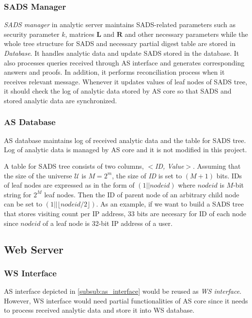 \subsubsection{SADS Manager}
\emph{SADS manager} in analytic server maintains SADS-related parameters such as security parameter $k$, matrices $\mathbf{L}$ and $\mathbf{R}$ and other necessary parameters while the whole tree structure for SADS and necessary partial digest table are stored in \emph{Database}. 
It handles analytic data and update SADS stored in the database.
It also processes queries received through AS interface and generates corresponding answers and proofs. 
In addition, it performs reconciliation process when it receives relevant message.
Whenever it updates values of leaf nodes of SADS tree, it should check the log of analytic data stored by AS core so that SADS and stored analytic data are synchronized. 


\subsubsection{AS Database}
AS database maintains log of received analytic data and the table for SADS tree.
Log of analytic data is managed by AS core and it is not modified in this project.

A table for SADS tree consists of two columns, \emph{$<$ID, Value$>$}.
Assuming that the size of the universe $\mathcal{U}$ is $M = 2^m$, the size of \emph{ID} is set to $(M+1)$ bits. 
IDs of leaf nodes are expressed as in the form of $(1 || nodeid)$ where $nodeid$ is $M$-bit string for $2^M$ leaf nodes.
Then the ID of parent node of an arbitrary child node can be set to $(1|| {\lfloor nodeid/2 \rfloor})$.
As an example, if we want to build a SADS tree that stores visiting count per IP address, $33$ bits are necesary for ID of each node since $nodeid$ of a leaf node is 32-bit IP address of a user.




\subsection{Web Server}
\subsubsection{WS Interface}
AS interface depicted in \ref{subsub:as_interface} would be reused as \emph{WS interface}.
However, WS interface would need partial functionalities of AS core since it needs to process received analytic data and store it into WS database.

